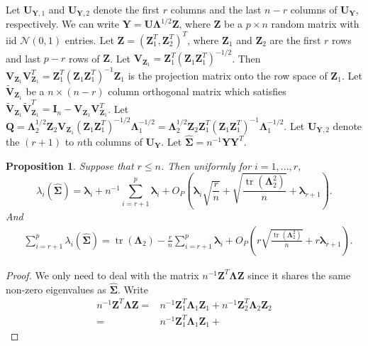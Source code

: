 \documentclass[12pt]{article} %
\DeclareMathOperator{\mytr}{tr}
\newcommand{\bQ}{\mathbf{Q}}
\newcommand{\bZ}{\mathbf{Z}}
\newcommand{\bY}{\mathbf{Y}}
\newcommand{\bI}{\mathbf{I}}
\newcommand{\bU}{\mathbf{U}}
\newcommand{\bV}{\mathbf{V}}
\newcommand{\bfsym}[1]{\ensuremath{\boldsymbol{#1}}}
\def\blambda {\bfsym {\lambda}}
\def\bLambda {\bfsym {\Lambda}}
\def\bSigma {\bfsym {\Sigma}}
\newtheorem{proposition}{Proposition}
\theoremstyle{definition}
\begin{document}
\begin{appendices}
Let $\bU_{\bY,1}$ and $\bU_{\bY,2}$ denote the first $r$ columns and the last $n-r$ columns of $\bU_{\bY}$, respectively.
We can write $\bY=\bU\bLambda^{1/2}\bZ$, where $\bZ$ be a $p\times n$ random matrix with iid $\mathcal{N}(0,1)$ entries.
    Let $\bZ =(\bZ_1^T,\bZ_2^T)^T$, where $\bZ_1$ and $\bZ_2$ are the first $r$ rows and last $p-r$ rows of $\bZ$.
    Let $\bV_{\bZ_1}=\bZ_1^T (\bZ_1 \bZ_1^T)^{-1/2}$.
    Then $\bV_{\bZ_1}\bV_{\bZ_1}^T=\bZ_1^T (\bZ_1 \bZ_1^T)^{-1}\bZ_1$ is the projection matrix onto the row space of $\bZ_1$.
    Let $\tilde{\bV}_{\bZ_1}$ be a $n\times (n-r)$ column orthogonal matrix which satisfies $\tilde{\bV}_{\bZ_1}\tilde{\bV}_{\bZ_1}^T= \bI_{n}-\bV_{\bZ_1}\bV_{\bZ_1}^T$.
    Let $
       \bQ=
       \bLambda_2^{1/2} \bZ_2 \bV_{\bZ_1} (\bZ_1 \bZ_1^T)^{-1/2} \bLambda_1^{-1/2}
       =
       \bLambda_2^{1/2} \bZ_2 \bZ_1^T (\bZ_1 \bZ_1^T)^{-1} \bLambda_1^{-1/2}
       $.
Let $\bU_{\bY,2}$ denote the $(r+1)$ to $n$th columns of $\bU_\bY$.
    Let $\hat{\bSigma}=n^{-1}\bY\bY^T$.
\begin{proposition}
    \label{eigenvalueProp}
    Suppose that $r\leq n$.
    Then uniformly for $i=1,\ldots, r$, 
\begin{equation}\label{eigenvalueProp:R1}
    \lambda_i(\hat{\bSigma})
        =
        \blambda_i
        +
        n^{-1}\sum_{i=r+1}^p\blambda_i
        +O_P\left(\blambda_i \sqrt{\frac{r}{n}}+\sqrt{\frac{\mytr(\bLambda_2^2)}{ n}}+\blambda_{r+1}\right).
    \end{equation}
And 
\begin{equation}\label{eigenvalueProp:R2}
    \begin{split}
     &\sum_{i=r+1}^p\lambda_i(\hat{\bSigma})
    =
\mytr(\bLambda_2)
    -
    \frac{r}{n}\sum_{i=r+1}^p \blambda_i
    +O_P\left(r\sqrt{\frac{\mytr(\bLambda_2^2)}{ n}}+r\blambda_{r+1}\right)
    .
    \end{split}
\end{equation}
\end{proposition}
\begin{proof}
    We only need to deal with the matrix $n^{-1}\bZ^T \bLambda \bZ$ since it shares the same non-zero eigenvalues as $\hat{\bSigma}$.
    Write
    \begin{equation*}
        \begin{split}
        n^{-1}\bZ^T \bLambda \bZ=&
        n^{-1}\bZ_1^T \bLambda_1 \bZ_1+
        n^{-1}\bZ_2^T \bLambda_2 \bZ_2
        \\
        =&
        n^{-1}\bZ_1^T \bLambda_1 \bZ_1+

\end{split}
\end{equation*}
\end{proof}
\end{appendices}
\end{document}
